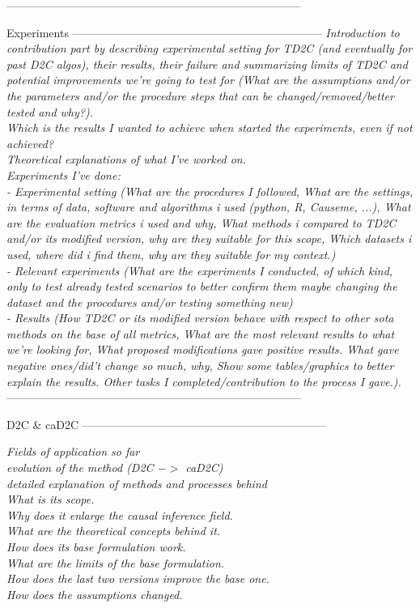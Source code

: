 ------------------------------------------------------------------------------

Experiments ------------------------------------------------------------------
\textit{Introduction to contribution part by describing experimental setting for TD2C (and eventually for past D2C algos), their results, their failure and summarizing limits of TD2C and potential improvements we're going to test for (What are the assumptions and/or the parameters and/or the procedure steps that can be changed/removed/better tested and why?).\\
Which is the results I wanted to achieve when started the experiments, even if not achieved?\\
Theoretical explanations of what I've worked on.\\
Experiments I've done: \\
- Experimental setting (What are the procedures I followed, What are the settings, in terms of data, software and algorithms i used (python, R, Causeme, ...), What are the evaluation metrics i used and why,  What methods i compared to TD2C and/or its modified version, why are they suitable for this scope, Which datasets i used, where did i find them, why are they suitable for my context.)\\
- Relevant experiments (What are the experiments I conducted, of which kind, only to test already tested scenarios to better confirm them maybe changing the dataset and the procedures and/or testing something new)\\
- Results (How TD2C or its modified version behave with respect to other sota methods on the base of all metrics, What are the most relevant results to what we're looking for, What proposed modifications gave positive results.  What gave negative ones/did't change so much, why, Show some tables/graphics to better explain the results. Other tasks I completed/contribution to the process I gave.).}\\

------------------------------------------------------------------------------

D2C \& caD2C -----------------------------------------------------------------

\textit{Fields of application so far\\
evolution of the method (D2C $->$ caD2C)\\
detailed explanation of methods and processes behind\\
What is its scope.\\
Why does it enlarge the causal inference field.\\
What are the theoretical concepts behind it.\\
How does its base formulation work.\\
What are the limits of the base formulation.\\
How does the last two versions improve the base one.\\
How does the assumptions changed.}\\

